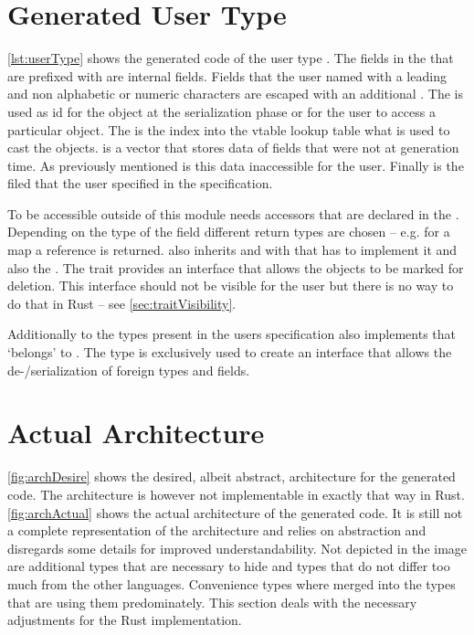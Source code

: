 \documentclass[thesis]{subfiles}
\begin{document}
\section{Generated User Type}
  \autoref{lst:userType} shows the generated code of the user type \Age.
  The fields in the \Age \struct that are prefixed with  are internal fields.
  Fields that the user named with a leading  and non alphabetic or numeric characters are escaped with an additional .
  The \skillid is used as id for the object at the serialization phase or for the user to access a particular object.
  The \typeid is the index into the vtable lookup table what is used to cast the objects.
  \foreigndata is a vector that stores data of fields that were not at generation time.
  As previously mentioned is this data inaccessible for the user.
  Finally is \age the filed that the user specified in the specification.

  To be accessible outside of this module \age needs accessors that are declared in the \AgeObject \trait.
  Depending on the type of the field different return types are chosen -- e.g. for a map a reference is returned.
  \AgeObject also inherits \SkillObject and with that has to implement it and also the \Deleteable \trait.
  The \Deleteable trait provides an interface that allows the objects to be marked for deletion.
  This interface should not be visible for the user but there is no way to do that in Rust -- see \autoref{sec:traitVisibility}.

  Additionally to the types present in the users specification \Age also implements \ForeignObject that `belongs' to \Foreign.
  The \Foreign type is exclusively used to create an interface that allows the de-/serialization of foreign types and fields.

  

\section{Actual Architecture}
  \autoref{fig:archDesire} shows the desired, albeit abstract, architecture for the generated code.
  The architecture is however not implementable in exactly that way in Rust.
  \autoref{fig:archActual} shows the actual architecture of the generated code.
  It is still not a complete representation of the architecture and relies on abstraction and disregards some details for improved understandability.
  Not depicted in the image are additional types that are necessary to hide \traits and types that do not differ too much from the other languages.
  Convenience types where merged into the types that are using them predominately.
  This section deals with the necessary adjustments for the Rust implementation.
\end{document}
